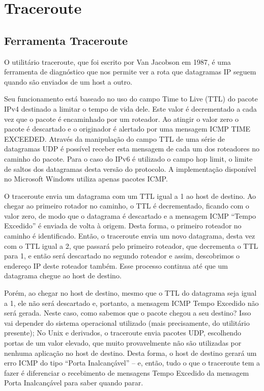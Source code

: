 \chapter{Traceroute}

\section{Ferramenta Traceroute}
O utilitário traceroute, que foi escrito por Van Jacobson em 1987, é uma
ferramenta de diagnóstico que nos permite ver a rota que datagramas IP seguem
 quando são enviados de um host a outro.

Seu funcionamento está baseado no uso do campo Time to Live (TTL) do pacote IPv4
destinado a limitar o tempo de vida dele. Este valor é decrementado a cada vez
que o pacote é encaminhado por um roteador. Ao atingir o valor zero o pacote é
descartado e o originador é alertado por uma mensagem ICMP TIME EXCEEDED.
Através da manipulação do campo TTL de uma série de datagramas UDP é possível
receber esta mensagem de cada um dos roteadores no caminho do pacote. Para
o caso do IPv6 é utilizado o campo hop limit, o limite de saltos dos
datagramas desta versão do protocolo. A implementação disponível no
Microsoft Windows utiliza apenas pacotes ICMP.

O traceroute envia um datagrama com um TTL igual a 1 ao host de destino.
Ao chegar ao primeiro rotador no caminho, o TTL é decrementado, ficando
com o valor zero, de modo que o datagrama é descartado e a mensagem ICMP
“Tempo Excedido” é enviada de volta à origem. Desta forma, o primeiro roteador
no caminho é identificado. Então, o traceroute envia um novo datagrama, desta
vez com o TTL igual a 2, que passará pelo primeiro roteador, que decrementa o
TTL para 1, e então será descartado no segundo roteador e assim, descobrimos
o endereço IP deste roteador também. Esse processo continua até que um datagrama
 chegue ao host de destino.


Porém, ao chegar no host de destino, mesmo que o TTL do datagrama seja igual a 1,
ele não será descartado e, portanto, a mensagem ICMP Tempo Excedido não será gerada.
Neste caso, como sabemos que o pacote chegou a seu destino? Isso vai depender do
sistema operacional utilizado (mais precisamente, do utilitário presente); No Unix
e derivados, o traceroute envia pacotes UDP, escolhendo portas de um valor elevado,
que muito provavelmente não são utilizadas por nenhuma aplicação no host de destino.
Desta forma, o host de destino gerará um erro ICMP do tipo “Porta Inalcançável” – e,
então, tudo o que o traceroute tem a fazer é diferenciar o recebimento de mensagens
Tempo Excedido da mensagem Porta Inalcançável para saber quando parar.

